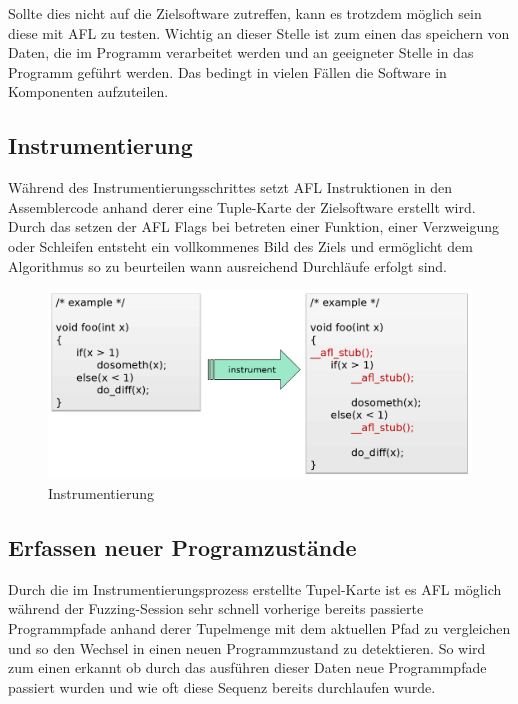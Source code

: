 \documentclass[12pt,a4paper]{scrreprt}
\begin{document}
Sollte dies nicht auf die Zielsoftware zutreffen, kann es trotzdem möglich sein diese mit AFL zu testen. Wichtig an dieser Stelle ist zum einen das speichern von Daten, die im Programm verarbeitet werden und an geeigneter Stelle in das Programm geführt werden. Das bedingt in vielen Fällen die Software in Komponenten aufzuteilen. 


\newpage
\subsection{Instrumentierung}	

Während des Instrumentierungsschrittes setzt AFL Instruktionen in den Assemblercode anhand derer eine Tuple-Karte der Zielsoftware erstellt wird. Durch das setzen der AFL Flags bei betreten einer Funktion, einer Verzweigung oder Schleifen entsteht ein vollkommenes Bild des Ziels und ermöglicht dem Algorithmus so zu beurteilen wann ausreichend Durchläufe erfolgt sind.


\begin{figure}
\centering
	\includegraphics[width=1\textwidth]{instrument.png}
	\caption{Instrumentierung}

\end{figure}


\subsection{Erfassen neuer Programzustände}

Durch die im Instrumentierungsprozess erstellte Tupel-Karte ist es AFL möglich während der Fuzzing-Session sehr schnell vorherige bereits passierte Programmpfade anhand derer Tupelmenge mit dem aktuellen Pfad zu vergleichen und so den Wechsel in einen neuen Programmzustand zu detektieren. 
So wird zum einen erkannt ob durch das ausführen dieser Daten neue Programmpfade passiert wurden und wie oft diese Sequenz bereits durchlaufen wurde.
\end{document}
